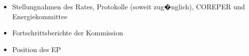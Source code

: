 \documentclass[9pt,a4paper,ngerman]{report}
\begin{document}
\begin{itemize}
\begin{itemize}
\begin{itemize}
			\normalmarginpar	
			
												\item{\textcolor{dunkelgrau.60}{ Stellungnahmen 
															des	Rates,  Protokolle (soweit 
															zug�nglich), COREPER und 															Energiekommittee}}				
								\item{\textcolor{dunkelgrau.60}{Fortschrittsberichte der 
											Kommission}}
								\item{\textcolor{dunkelgrau.60}{Position des EP}}
								
							\end{itemize}
							
				\end{itemize}
				
	\end{itemize} 							
 							
\end{document}
